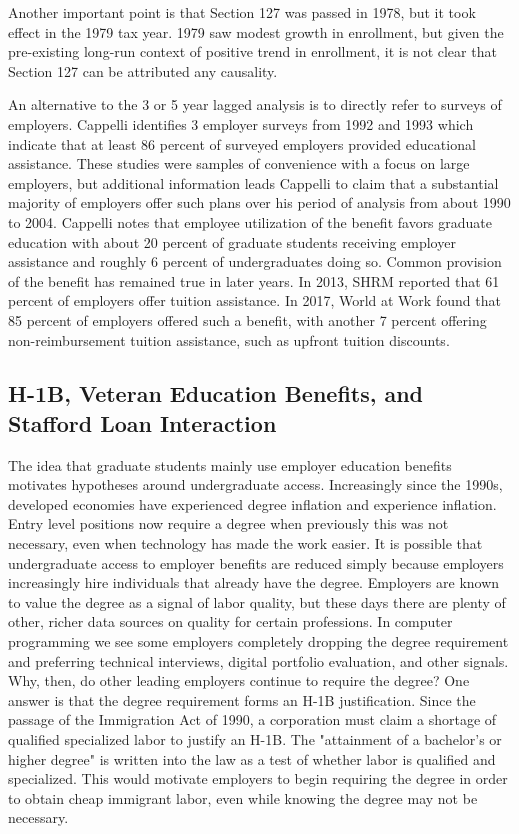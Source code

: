 \documentclass[review]{elsarticle}
\begin{document}
    Another important point is that Section 127 was passed in 1978, but it took effect in the 1979 tax year.
    1979 saw modest growth in enrollment,
    but given the pre-existing long-run context of positive trend in enrollment,
    it is not clear that Section 127 can be attributed any causality.

    An alternative to the 3 or 5 year lagged analysis is to directly refer to surveys of employers.
    Cappelli\cite{cappelli2004employers} identifies 3 employer surveys from 1992 and 1993 which indicate that at least 86 percent of surveyed employers provided educational assistance.
    These studies were samples of convenience with a focus on large employers,
    but additional information leads Cappelli to claim that a substantial majority of employers offer such plans over his period of analysis from about 1990 to 2004.
    Cappelli notes that employee utilization of the benefit favors graduate education
    with about 20 percent of graduate students receiving employer assistance
    and roughly 6 percent of undergraduates doing so.
    Common provision of the benefit has remained true in later years.
    In 2013, SHRM reported that 61 percent of employers offer tuition assistance\cite{cherry2014rejuvenating}.
    In 2017, World at Work found that 85 percent of employers offered such a benefit,
    with another 7 percent offering non-reimbursement tuition assistance, such as upfront tuition discounts\cite{talentculture_2018}.

    \subsection{H-1B, Veteran Education Benefits, and Stafford Loan Interaction}
    The idea that graduate students mainly use employer education benefits motivates hypotheses around undergraduate access.
    Increasingly since the 1990s, developed economies have experienced degree inflation and experience inflation.
    Entry level positions now require a degree when previously this was not necessary, even when technology has made the work easier.
    It is possible that undergraduate access to employer benefits are reduced simply because employers increasingly hire individuals that already have the degree.
    Employers are known to value the degree as a signal of labor quality, but these days there are plenty of other, richer data sources on quality for certain professions.
    In computer programming we see some employers completely dropping the degree requirement and preferring technical interviews, digital portfolio evaluation, and other signals.
    Why, then, do other leading employers continue to require the degree?
    One answer is that the degree requirement forms an H-1B justification.
    Since the passage of the Immigration Act of 1990\cite{law1990law}, a corporation must claim a shortage of qualified specialized labor to justify an H-1B.
    The "attainment of a bachelor's or higher degree" is written into the law as a test of whether labor is qualified and specialized.
    This would motivate employers to begin requiring the degree in order to obtain cheap immigrant labor, even while knowing the degree may not be necessary.
\end{document}
